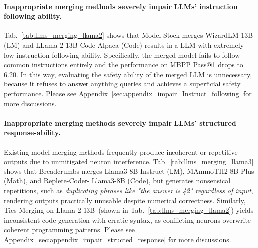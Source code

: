 



\paragraph{Inappropriate merging methods severely impair LLMs' instruction following ability.}
\label{sec:discussion_impair}
Tab.~\ref{tab:llms_merging_llama2} shows that Model Stock merges WizardLM-13B (LM) and LLama-2-13B-Code-Alpaca (Code) results in a LLM with extremely low instruction following ability. Specifically, the merged model fails to follow common instructions entirely and the performance on MBPP Pass@1 drops to 6.20. In this way, evaluating the safety ability of the merged LLM is unnecessary, because it refuses to answer anything queries and achieves a superficial safety performance. Please see Appendix~\ref{sec:appendix_impair_Instruct_following} for more discussions.

\paragraph{Inappropriate merging methods severely impair LLMs' structured response-ability.}
Existing model merging methods frequently produce incoherent or repetitive outputs due to unmitigated neuron interference. Tab.~\ref{tab:llms_merging_llama3} shows that Breadcrumbs merges Llama3-8B-Instruct (LM), MAmmoTH2-8B-Plus (Math), and Replete-Coder-
Llama3-8B (Code), but generates nonsensical repetitions, such as \textit{duplicating phrases like "the answer is 42" regardless of input}, rendering outputs practically unusable despite numerical correctness.
Similarly, Ties-Merging on Llama-2-13B~(shown in Tab.~\ref{tab:llms_merging_llama2}) yields inconsistent code generation with erratic syntax, as conflicting neurons overwrite coherent programming patterns. Please see Appendix~\ref{sec:appendix_impair_structed_response} for more discussions.


